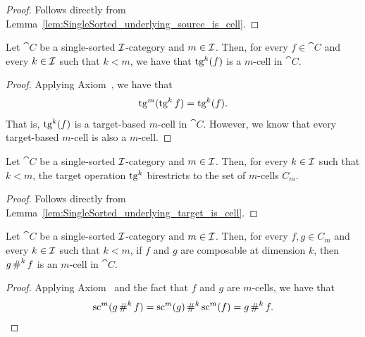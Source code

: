 \begin{proof}
  \leanok
  Follows directly from Lemma~\ref{lem:SingleSorted_underlying_source_is_cell}.
\end{proof}

\begin{lemma}
  \label{lem:SingleSorted_underlying_target_is_cell}
  \leanok
  Let $\cat{C}$ be a single-sorted $\mathcal{I}$-category and $m \in \mathcal{I}$. Then, for every $f \in
  \cat{C}$ and every $k \in \mathcal{I}$ such that $k < m$, we have that $\operatorname{tg}^k (f)$ is a $m$-cell in
  $\cat{C}$.
\end{lemma}

\begin{proof}
  \leanok
  Applying Axiom~, we have that
  \[
    \operatorname{tg}^m (\operatorname{tg}^k f) = \operatorname{tg}^k (f).
  \]
  That is, $\operatorname{tg}^k (f)$ is a target-based $m$-cell in $\cat{C}$. However, we know that every
  target-based $m$-cell is also a $m$-cell.
\end{proof}

\begin{corollary}
  \label{cor:SingleSorted_underlying_target_birestriction}
  \leanok
  Let $\cat{C}$ be a single-sorted $\mathcal{I}$-category and $m \in \mathcal{I}$. Then, for every $k \in
  \mathcal{I}$ such that $k < m$, the target operation $\operatorname{tg}^k$ birestricts to the set of $m$-cells $C_m$.
\end{corollary}

\begin{proof}
  \leanok
  Follows directly from Lemma~\ref{lem:SingleSorted_underlying_target_is_cell}.
\end{proof}

\begin{lemma}
  \label{lem:SingleSorted_underlying_comp_is_cell}
  \leanok
  Let $\cat{C}$ be a single-sorted $\mathcal{I}$-category and $m \in \mathcal{I}$. Then, for every $f, g \in
  C_m$ and every $k \in \mathcal{I}$ such that $k < m$, if $f$ and $g$ are composable at dimension $k$,
  then $g \operatorname{\#}^k f$ is an $m$-cell in $\cat{C}$.
\end{lemma}

\begin{proof}
  \leanok
  Applying Axiom~ and the fact that $f$
  and $g$ are $m$-cells, we have that
  \[
    \operatorname{sc}^m (g \operatorname{\#}^k f) = \operatorname{sc}^m (g) \operatorname{\#}^k \operatorname{sc}^m (f) = g \operatorname{\#}^k f.
  \]
\end{proof}

